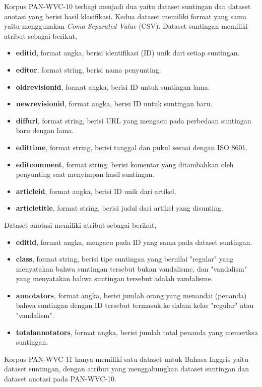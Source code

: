 \documentclass[12pt,a4paper,titlepage]{article}
\begin{document}
Korpus PAN-WVC-10 terbagi menjadi dua yaitu dataset suntingan dan dataset anotasi yang berisi hasil klasifikasi.
Kedua dataset memiliki format yang sama yaitu menggunakan \textit{Coma Separated Value} (CSV).
Dataset suntingan memiliki atribut sebagai berikut,
\begin{itemize}
	\item \textbf{editid}, format angka, berisi identifikasi (ID) unik dari setiap suntingan.
	\item \textbf{editor}, format string, berisi nama penyunting.
	\item \textbf{oldrevisionid}, format angka, berisi ID untuk suntingan lama.
	\item \textbf{newrevisionid}, format angka, berisi ID untuk suntingan baru.
	\item \textbf{diffurl}, format string, berisi URL yang mengacu pada perbedaan suntingan baru dengan lama.
	\item \textbf{edittime}, format string, berisi tanggal dan pukul sesuai dengan ISO 8601.
	\item \textbf{editcomment}, format string, berisi komentar yang ditambahkan oleh penyunting saat menyimpan hasil suntingan.
	\item \textbf{articleid}, format angka, berisi ID unik dari artikel.
	\item \textbf{articletitle}, format string, berisi judul dari artikel yang disunting.
\end{itemize}

Dataset anotasi memiliki atribut sebagai berikut,
\begin{itemize}
	\item \textbf{editid}, format angka, mengacu pada ID yang sama pada dataset suntingan.
	\item \textbf{class}, format string, berisi tipe suntingan yang bernilai "regular" yang menyatakan bahwa suntingan tersebut bukan vandalisme, dan "vandalism" yang menyatakan bahwa suntingan tersebut adalah vandalisme.
	\item \textbf{annotators}, format angka, berisi jumlah orang yang menandai (penanda) bahwa suntingan dengan ID tersebut termasuk ke dalam kelas "regular" atau "vandalism".
	\item \textbf{totalannotators}, format angka, berisi jumlah total penanda yang memeriksa suntingan.
\end{itemize}

Korpus PAN-WVC-11 hanya memiliki satu dataset untuk Bahasa Inggris yaitu dataset suntingan, dengan atribut yang menggabungkan dataset suntingan dan dataset anotasi pada PAN-WVC-10.
\end{document}
